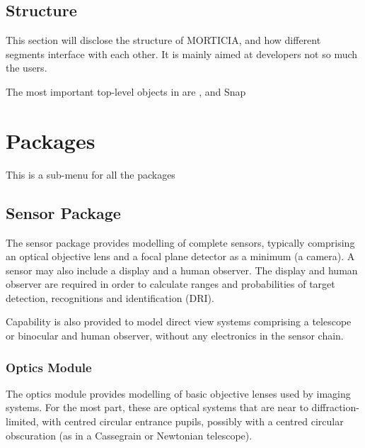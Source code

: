 \documentclass[a4paper,10pt,english]{sphinxmanual}
\begin{document}
\section{Structure}
\label{for_developers:structure}
This section will disclose the structure of MORTICIA, and how different segments interface with each other. It is mainly aimed at developers not so much the users.

The most important top-level objects in  are {\hyperref[packages:sensor\string-package]{}} , {\hyperref[packages:scene\string-package]{}} and Snap


\chapter{Packages}
\label{packages:packages}\label{packages::doc}
This is a sub-menu for all the packages


\section{Sensor Package}
\label{packages:sensor-package}\label{packages:id1}
The sensor package provides modelling of complete sensors, typically comprising an optical objective lens and
a focal plane detector as a minimum (a camera). A sensor may also include a display and a human observer. The display
and human observer are required in order to calculate ranges and probabilities of target detection, recognitions and
identification (DRI).

Capability is also provided to model direct view systems comprising a telescope or binocular and human observer, without
any electronics in the sensor chain.


\subsection{Optics Module}
\label{packages:id2}\label{packages:optics-module}
The optics module provides modelling of basic objective lenses used by imaging systems. For the most part, these are
optical systems that are near to diffraction-limited, with centred circular entrance pupils, possibly with a centred
circular obscuration (as in a Cassegrain or Newtonian telescope).
\label{packages:module-optics}
\end{document}
